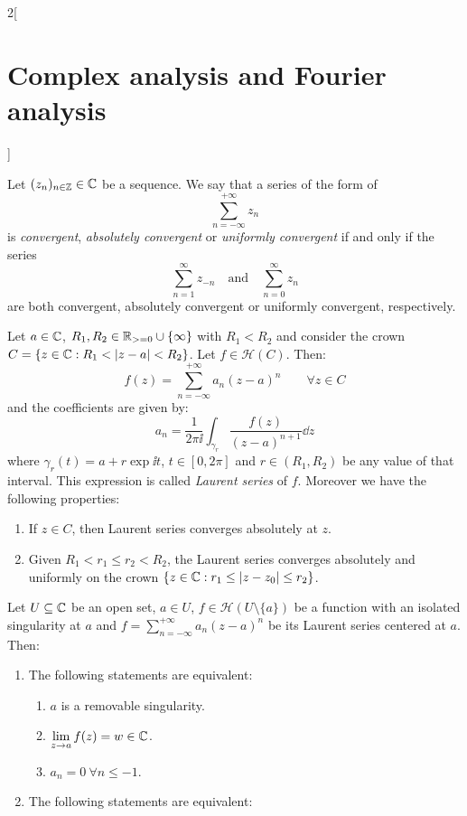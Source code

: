 \documentclass[../../../main.tex]{subfiles}
\begin{document}
\begin{multicols}{2}[\section{Complex analysis and Fourier analysis}]
\begin{definition}
  \end{definition}
  \begin{definition}
    Let $(z_n)_{n\in\mathbb{Z}}\in\mathbb{C}$ be a sequence. We say that a series of the form of $$\sum_{n=-\infty}^{+\infty} z_n$$ is \emph{convergent}, \emph{absolutely convergent} or \emph{uniformly convergent} if and only if the series $$\sum_{n=1}^{\infty}z_{-n}\quad\text{and}\quad\sum_{n=0}^\infty z_n$$ are both convergent, absolutely convergent or uniformly convergent, respectively.
  \end{definition}
  \begin{theorem}
    Let $a\in\mathbb{C}$, $R_1,R_2\in\mathbb{R}_{>=0}\cup\{\infty\}$ with $R_1<R_2$ and consider the crown $C=\{z\in\mathbb{C}:R_1<\abs{z-a}<R_2\}$. Let $f\in\mathcal{H}(C)$. Then: $$f(z)=\sum_{n=-\infty}^{+\infty} a_n{(z-a)}^n\qquad\forall z\in C$$ and the coefficients are given by: $$a_n=\frac{1}{2\pi\ii}\int_{\gamma_r}\frac{f(z)}{{(z-a)}^{n+1}}\dd{z}$$ where $\gamma_r(t)=a+r\exp{\ii t}$, $t\in[0,2\pi]$ and $r\in(R_1,R_2)$ be any value of that interval. This expression is called \emph{Laurent series} of $f$. Moreover we have the following properties:
    \begin{enumerate}
      \item If $z\in C$, then Laurent series converges absolutely at $z$.
      \item Given $R_1<r_1\leq r_2<R_2$, the Laurent series converges absolutely and uniformly on the crown $\{z\in\mathbb{C}:r_1\leq\abs{z-z_0}\leq r_2\}$.
    \end{enumerate}
  \end{theorem}
  \begin{corollary}
    Let $U\subseteq \mathbb{C}$ be an open set, $a\in U$, $f\in\mathcal{H}(U\setminus\{a\})$ be a function with an isolated singularity at $a$ and $f=\sum_{n=-\infty}^{+\infty} a_n{(z-a)}^n$ be its Laurent series centered at $a$. Then:
    \begin{enumerate}
      \item The following statements are equivalent:
            \begin{enumerate}
              \item $a$ is a removable singularity.
              \item $\displaystyle\lim_{z\to a} f(z)= w\in\mathbb{C}$.
              \item $a_n=0\ \forall n\leq -1$.
            \end{enumerate}
      \item  The following statements are equivalent:

\end{enumerate}
\end{corollary}
\end{multicols}
\end{document}
